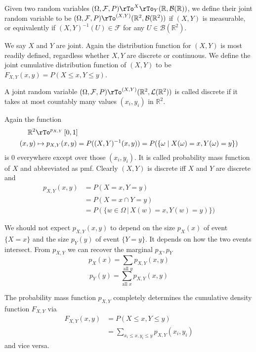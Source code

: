 \documentclass[12pt]{amsart}
\theoremstyle{definition}
\begin{document}
\dfn Given two random variables $(\Omega, \mathcal{F}, P) \pile{\rTo^X \\ \rTo_Y} (\mathbb{R}, \mathcal{B}(\mathbb{R}))$, we define their joint random variable to be $(\Omega, \mathcal{F}, P) \rTo^{(X, Y)} (\mathbb{R}^2, \mathcal{B}(\mathbb{R}^2))$ if $(X, Y)$ is measurable, or equivalently if $(X, Y)^{-1}(U) \in \mathcal{F}$ for any $U \in \mathcal{B}(\mathbb{R}^2)$.

We say $X$ and $Y$ are joint. Again the distribution function for $(X, Y)$ is most readily defined, regardless whether $X, Y$ are discrete or continuous.
\dfn We define the joint cumulative distribution function of $(X, Y)$ to be $F_{X, Y}(x, y) = P(X \leq x, Y \leq y)$.

\dfn A joint random variable $(\Omega, \mathcal{F}, P) \rTo^{(X, Y)} (\mathbb{R}^2, \mathcal{L}(\mathbb{R}^2))$ is called discrete if it takes at most countably many values $(x_i, y_i)$ in $\mathbb{R}^2$.

Again the function
\begin{align*}
\mathbb{R}^2 & \rTo^{p_{X, Y}} \left[0, 1 \right] \\
(x, y) & \mapsto p_{X, Y}(x, y) = P((X, Y)^{-1}(x, y)) = P(\{\omega \mid X(\omega) = x, Y(\omega) = y\})
\end{align*}
is 0 everywhere except over those $(x_i, y_i)$. It is called probability mass function of $X$ and abbreviated as pmf. Clearly $(X, Y)$ is discrete iff $X$ and $Y$ are discrete and
\begin{align*}
p_{X, Y}(x, y) & = P(X = x, Y= y) \\
 & = P(X = x \cap Y = y) \\
 & = P(\{w \in \Omega \,|\, X(w) = x, Y(w) = y) \})
\end{align*}

We should not expect $p_{X, Y}(x, y)$ to depend on the size $p_X(x)$ of event $\{X = x\}$ and the size $p_Y(y)$ of event $\{Y = y\}$. It depends on how the two events intersect. From $p_{X, Y}$ we can recover the marginal $p_X, p_Y$
$$p_X(x) = \sum\limits_{\text{all }y} p_{X, Y}(x, y)$$
$$p_Y(y) = \sum\limits_{\text{all } x} p_{X, Y}(x, y)$$

The probability mass function $p_{X, Y}$ completely determines the cumulative density function $F_{X, Y}$ via
\begin{align*}
F_{X, Y}(x, y) & = P(X \leq x, Y \leq y) \\
 & = \sum\limits_{x_i \leq x, y_i \leq y} p_{X, Y}(x_i, y_i)
\end{align*}
and vice versa.
\end{document}
